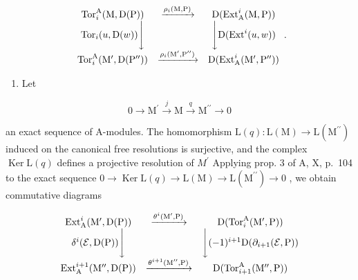 \[
\begin{array}{c c c} \operatorname{Tor} _ {i} ^ {\mathrm{A}} (\mathrm{M}, \mathrm{D} (\mathrm{P})) & \xrightarrow {\rho_ {i} (\mathrm{M} , \mathrm{P})} & \mathrm{D} (\operatorname{Ext} _ {\mathrm{A}} ^ {i} (\mathrm{M}, \mathrm{P})) \\ \operatorname{Tor} _ {i} (u, \mathrm{D} (w)) \Bigg \downarrow & & \Bigg \downarrow \mathrm{D} (\operatorname{Ext} ^ {i} (u, w)) \\ \operatorname{Tor} _ {i} ^ {\mathrm{A}} (\mathrm{M} ^ {\prime}, \mathrm{D} (\mathrm{P} ^ {\prime \prime})) & \xrightarrow {\rho_ {i} (\mathrm{M} ^ {\prime} , \mathrm{P} ^ {\prime \prime})} & \mathrm{D} (\operatorname{Ext} _ {\mathrm{A}} ^ {i} (\mathrm{M} ^ {\prime}, \mathrm{P} ^ {\prime \prime})) \end{array} .
\]

\begin{enumerate}
\def\labelenumi{\arabic{enumi})}
\setcounter{enumi}{1}
\tightlist
\item
  Let
\end{enumerate}

\[
0 \to \mathrm{M} ^ {\prime} \xrightarrow {j} \mathrm{M} \xrightarrow {q} \mathrm{M} ^ {\prime \prime} \to 0\tag{ℰ}
\]

an exact sequence of A-modules. The homomorphism \(\mathrm{L}(q):\mathrm{L}(\mathrm{M})\to\mathrm{L}(\mathrm{M}^{\prime\prime})\) induced on the canonical free resolutions is surjective, and the complex \(\operatorname{Ker}\mathrm{L}(q)\) defines a projective resolution of \(M^{\prime}\) Applying prop. 3 of A, X, p.~104 to the exact sequence \(0\to\operatorname{Ker}\mathrm{L}(q)\to\mathrm{L}(\mathrm{M})\to\mathrm{L}(\mathrm{M}^{\prime\prime})\to0\) , we obtain commutative diagrams

\[
\begin{array}{c c c} \operatorname{Ext} _ {\mathrm{A}} ^ {i} (\mathrm{M} ^ {\prime}, \mathrm{D} (\mathrm{P})) & \xrightarrow {\theta^ {i} (\mathrm{M} ^ {\prime} , \mathrm{P})} & \mathrm{D} (\operatorname{Tor} _ {i} ^ {\mathrm{A}} (\mathrm{M} ^ {\prime}, \mathrm{P})) \\ \delta^ {i} (\mathcal {E}, \mathrm{D} (\mathrm{P})) \Bigg \downarrow & & \Bigg \downarrow (- 1) ^ {i + 1} \mathrm{D} (\partial_ {i + 1} (\mathcal {E}, \mathrm{P})) \\ \operatorname{Ext} _ {\mathrm{A}} ^ {i + 1} (\mathrm{M} ^ {\prime \prime}, \mathrm{D} (\mathrm{P})) & \xrightarrow {\theta^ {i + 1} (\mathrm{M} ^ {\prime \prime} , \mathrm{P})} & \mathrm{D} (\operatorname{Tor} _ {i + 1} ^ {\mathrm{A}} (\mathrm{M} ^ {\prime \prime}, \mathrm{P})) \end{array}
\]

